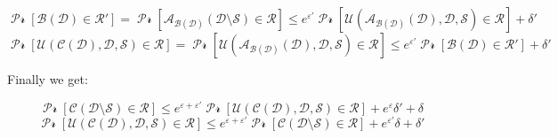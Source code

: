 \documentclass{article}
\begin{document}
\[ \mathcal{\Pr[B(D) \in R']} = \mathcal{\Pr[A_{B(D)}(D \setminus S) \in R]} \leq e^{\varepsilon'} \mathcal{\Pr[U(A_{B(D)}(D), D, S) \in R]} + \delta' \]
\[ \mathcal{\Pr[U(C(D), D, S) \in R]} = \mathcal{\Pr[U(A_{B(D)}(D), D, S) \in R]} \leq e^{\varepsilon'} \mathcal{\Pr[B(D) \in R']} + \delta' \]

Finally we get:

\[ \mathcal{\Pr[C(D \setminus S) \in R]} \leq e^{\varepsilon + \varepsilon'} \mathcal{\Pr[U(C(D), D, S) \in R]} + e^\varepsilon \delta' + \delta \]
\[ \mathcal{\Pr[U(C(D), D, S) \in R]} \leq e^{\varepsilon + \varepsilon'} \mathcal{\Pr[C(D \setminus S) \in R]} + e^{\varepsilon'} \delta + \delta' \]
\end{document}
